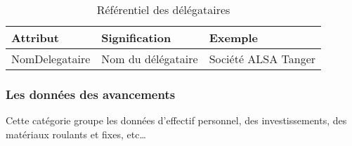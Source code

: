 	\begin{table}[H]
		\begin{center}
			\begin{tabularx}{17.5cm}{|p{3cm}|p{3cm}|X|}
				\hline
				\textbf{Attribut} & \textbf{Signification} & \textbf{Exemple}    \\
				\hline
				NomDelegataire    & Nom du délégataire     & Société ALSA Tanger \\
				\hline
			\end{tabularx}
			\caption{Référentiel des délégataires}
		\end{center}
	\end{table}

	\newpage
	\subsubsection{Les données des avancements}

	Cette catégorie groupe les données d'effectif personnel, des investissements, des matériaux roulants et fixes, etc\dots


